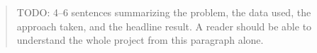 \begin{abstract}
\noindent
TODO: 4--6 sentences summarizing the problem, the data used, the approach
taken, and the headline result. A reader should be able to understand the
whole project from this paragraph alone.
\end{abstract}
